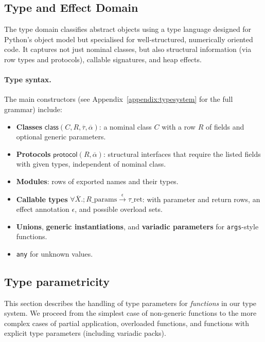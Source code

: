 \subsection{Type and Effect Domain}

The type domain classifies abstract objects using a type language designed for Python’s object model but specialised for well-structured, numerically oriented code.
It captures not just nominal classes, but also structural information (via row types and protocols), callable signatures, and heap effects.

\paragraph{Type syntax.}
The main constructors (see Appendix~\ref{appendix:typesystem} for the full grammar) include:
\begin{itemize}
\item \textbf{Classes} $\mathsf{class}(C, R, \overline{\tau}, \overline{\alpha})$: a nominal class $C$ with a row $R$ of fields and optional generic parameters.
\item \textbf{Protocols} $\mathsf{protocol}(R, \overline{\alpha})$: structural interfaces that require the listed fields with given types, independent of nominal class.
\item \textbf{Modules}: rows of exported names and their types.
\item \textbf{Callable types} $\forall \overline{X}.;R\_{\mathrm{params}} \xrightarrow{\epsilon} \tau\_{\mathrm{ret}}$: with parameter and return rows, an effect annotation $\epsilon$, and possible overload sets.
\item \textbf{Unions}, \textbf{generic instantiations}, and \textbf{variadic parameters} for \texttt{\*args}-style functions.
\item \texttt{any} for unknown values.
\end{itemize}

\subsection{Type parametricity}
\label{subsec:type-parametricity}

This section describes the handling of type parameters for \emph{functions} in our type system.
We proceed from the simplest case of non-generic functions to the more complex cases
of partial application, overloaded functions, and functions with explicit type parameters
(including variadic packs).

